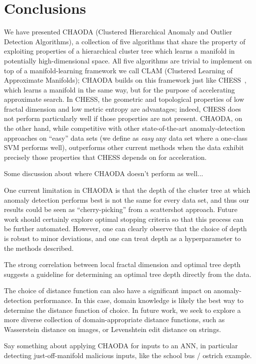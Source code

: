 \section{Conclusions}
\label{sec:conclusions}

We have presented CHAODA (Clustered Hierarchical Anomaly and Outlier Detection Algorithms), a collection of five algorithms that share the property of exploiting properties of a hierarchical cluster tree which learns a manifold in potentially high-dimensional space.
All five algorithms are trivial to implement on top of a manifold-learning framework we call CLAM (Clustered Learning of Approximate Manifolds); CHAODA builds on this framework just like CHESS~\cite{ishaq2019entropy}, which learns a manifold in the same way, but for the purpose of accelerating approximate search.
In CHESS, the geometric and topological properties of low fractal dimension and low metric entropy are advantages; indeed, CHESS does not perform particularly well if those properties are not present.
CHAODA, on the other hand, while competitive with other state-of-the-art anomaly-detection approaches on ``easy'' data sets (we define as \textit{easy} any data set where a one-class SVM performs well), outperforms other current methods when the data exhibit precisely those properties that CHESS depends on for acceleration.


Some discussion about where CHAODA doesn't perform as well...

One current limitation in CHAODA is that the depth of the cluster tree at which anomaly detection performs best is not the same for every data set, and thus our results could be seen as ``cherry-picking'' from a scattershot approach.
Future work should certainly explore optimal stopping criteria so that this process can be further automated.
However, one can clearly observe that the choice of depth is robust to minor deviations, and one can treat depth as a hyperparameter to the methods described.


The strong correlation between local fractal dimension and optimal tree depth suggests a guideline for determining an optimal tree depth directly from the data.

The choice of distance function can also have a significant impact on anomaly-detection performance.
In this case, domain knowledge is likely the best way to determine the distance function of choice.
In future work, we seek to explore a more diverse collection of domain-appropriate distance functions, such as Wasserstein distance on images, or Levenshtein edit distance on strings. 

Say something about applying CHAODA for inputs to an ANN, in particular detecting just-off-manifold malicious inputs, like the school bus / ostrich example.
